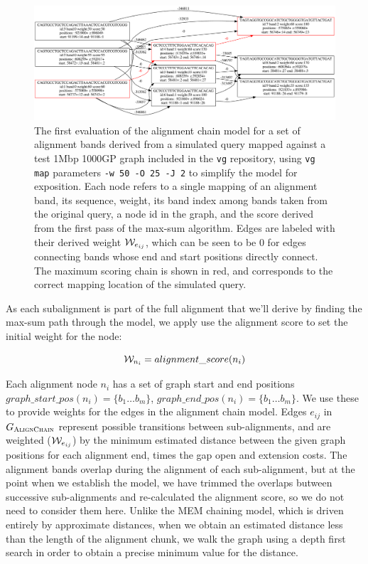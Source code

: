 \begin{figure}[htbp!]
\centering
\includegraphics[width=1.0\textwidth]{Chapter2/Figs/alignchain_dag.pdf}
\caption[The Alignment Chain Model]{
  The first evaluation of the alignment chain model for a set of alignment bands derived from a simulated query mapped against a test 1Mbp 1000GP graph included in the {\tt vg} repository, using {\tt vg map} parameters {\tt -w 50 -O 25 -J 2} to simplify the model for exposition.
  Each node refers to a single mapping of an alignment band, its sequence, weight, its band index among bands taken from the original query, a node id in the graph, and the score derived from the first pass of the max-sum algorithm.
  Edges are labeled with their derived weight ${\cal W}_{e_{ij}}$, which can be seen to be 0 for edges connecting bands whose end and start positions directly connect.
  The maximum scoring chain is shown in red, and corresponds to the correct mapping location of the simulated query.
}
\label{fig:alignmentchain_model}
\end{figure}


As each subalignment is part of the full alignment that we'll derive by finding the max-sum path through the model, we apply use the alignment score to set the initial weight for the node:

\begin{equation}
  {\cal W}_{n_i} = alignment\_score(n_i)
\end{equation}

Each alignment node $n_i$ has a set of graph start and end positions $graph\_start\_pos(n_i) = \{ b_1 \ldots b_m \}$, $graph\_end\_pos(n_i) = \{ b_1 \ldots b_m \}$.
We use these to provide weights for the edges in the alignment chain model.
Edges $e_{ij}$ in $G_\textsc{AlignChain}$ represent possible transitions between sub-alignments, and are weighted (${\cal W}_{e_{ij}}$) by the minimum estimated distance between the given graph positions for each alignment end, times the gap open and extension costs.
The alignment bands overlap during the alignment of each sub-alignment, but at the point when we establish the model, we have trimmed the overlaps butween successive sub-alignments and re-calculated the alignment score, so we do not need to consider them here.
Unlike the MEM chaining model, which is driven entirely by approximate distances, when we obtain an estimated distance less than the length of the alignment chunk, we walk the graph using a depth first search in order to obtain a precise minimum value for the distance.

